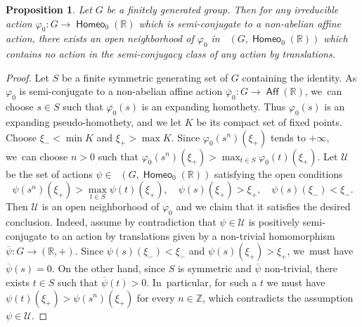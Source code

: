 \documentclass[JEP,XML,SOM,Unicode,NoFloatCountersInSection,published]{cedram}
\newtheorem{prop}[thm]{Proposition}
\theoremstyle{definition}
\DeclareMathOperator{\Aff}{\mathsf{Aff}}
\DeclareMathOperator{\homeo}{\mathsf{Homeo}}
\DeclareMathOperator{\Homirr}{\mathsf{Hom}_{\mathrm{irr}}}
\newcommand{\R}{\mathbb{R}}
\newcommand{\Z}{\mathbb Z}
\begin{document}
\begin{prop}\label{p.translations_away}
Let $G$ be a finitely generated group. Then for any irreducible action $\varphi_0\colon G\to \homeo_0(\R)$ which is semi-conjugate to a non-abelian affine action, there exists an open neighborhood of $\varphi_0$ in $\Homirr(G,\homeo_0(\R))$ which contains no action in the semi-conjugacy class of any action by translations.
\end{prop}

\begin{proof}
Let $S$ be a finite symmetric generating set of $G$ containing the identity. As $\varphi_0$ is semi-conjugate to a non-abelian affine action $\overline{\varphi}_0\colon G\to \Aff(\R)$, we~can choose $s\in S$ such that $\overline{\varphi_0}(s)$ is an expanding homothety. Thus $\varphi_0(s)$ is an expanding pseudo-homothety, and we let $K$ be its compact set of fixed points. Choose $\xi_-< \min K$ and $\xi_+>\max K$. Since $\varphi_0(s^n)(\xi_+)$ tends to $+\infty$, we~can choose $n>0$ such that $\varphi_0(s^n)(\xi_+)> \max_{t\in S} \varphi_0(t)(\xi_+)$. Let $\mathcal{U}$ be the set of actions $\psi\in \Homirr(G,\homeo_0(\R))$ satisfying the open conditions
\[\psi(s^n)(\xi_+)>\max_{t\in S} \psi(t)(\xi_+),\quad \psi(s)(\xi_+)>\xi_+,\quad \psi(s)(\xi_-)<\xi_-.
\]
Then $\mathcal{U}$ is an open neighborhood of $\varphi_0$ and we claim that it satisfies the desired conclusion. Indeed, assume by contradiction that $\psi\in \mathcal{U}$ is positively semi-conjugate to an action by translations given by a non-trivial homomorphism $\overline{\psi}\colon G\to (\R, +)$. Since $\psi(s)(\xi_-)<\xi_-$ and $\psi(s)(\xi_+)>\xi_+$, we~must have $\overline{\psi}(s)=0$. On the other hand, since $S$ is symmetric and $\overline\psi$ non-trivial, there exists $t\in S$ such that $\overline{\psi}(t)>0$. In~particular, for such a $t$ we must have $\psi(t)(\xi_+)>\psi(s^n)(\xi_+)$ for every $n\in \Z$, which contradicts the assumption $\psi\in \mathcal{U}$.
\end{proof}
\end{document}
